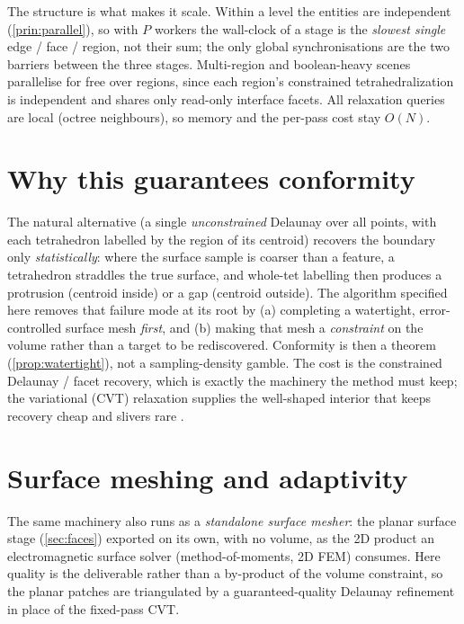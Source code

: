 \documentclass[11pt,a4paper]{article}
\numberwithin{equation}{section}
\begin{document}
The structure is what makes it scale. Within a level the entities are independent
(\cref{prin:parallel}), so with $P$ workers the wall-clock of a stage is the
\emph{slowest single} edge / face / region, not their sum; the only global
synchronisations are the two barriers between the three stages. Multi-region and
boolean-heavy scenes parallelise for free over regions, since each region's
constrained tetrahedralization is independent and shares only read-only interface
facets. All relaxation queries are local (octree neighbours), so memory and the
per-pass cost stay $O(N)$.

\section{Why this guarantees conformity}
\label{sec:conformity}
The natural alternative (a single \emph{unconstrained} Delaunay over all
points, with each tetrahedron labelled by the region of its centroid) recovers
the boundary only \emph{statistically}: where the surface sample is coarser than
a feature, a tetrahedron straddles the true surface, and whole-tet labelling then
produces a protrusion (centroid inside) or a gap (centroid outside). The
algorithm specified here removes that failure mode at its root by (a) completing
a watertight, error-controlled surface mesh \emph{first}, and (b) making that
mesh a \emph{constraint} on the volume rather than a target to be rediscovered.
Conformity is then a theorem
(\cref{prop:watertight}), not a sampling-density gamble. The cost is the
constrained Delaunay / facet recovery, which is exactly the machinery the method
must keep; the variational (CVT) relaxation supplies the well-shaped interior
that keeps recovery cheap and slivers rare
\cite{AlliezCohenSteiner2005,TournoisAlliez2009}.

\section{Surface meshing and adaptivity}
\label{sec:surface}
The same machinery also runs as a \emph{standalone surface mesher}: the planar
surface stage (\cref{sec:faces}) exported on its own, with no volume, as the 2D
product an electromagnetic surface solver (method-of-moments, 2D FEM) consumes.
Here quality is the deliverable rather than a by-product of the volume constraint,
so the planar patches are triangulated by a guaranteed-quality Delaunay refinement
in place of the fixed-pass CVT.
\end{document}
